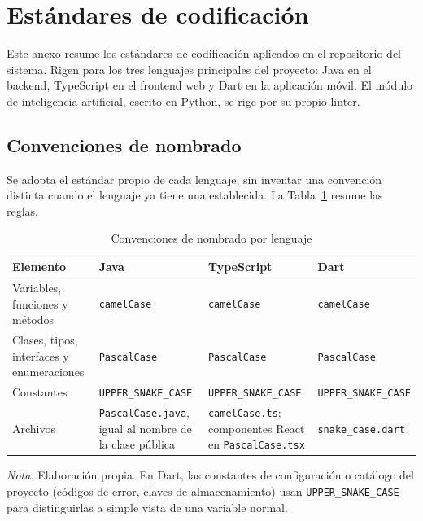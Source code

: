 \newpage
\section{Estándares de codificación}\label{ap:estandares_codificacion}

Este anexo resume los estándares de codificación aplicados en el repositorio del sistema. Rigen para los tres lenguajes principales del proyecto: Java en el backend, TypeScript en el frontend web y Dart en la aplicación móvil. El módulo de inteligencia artificial, escrito en Python, se rige por su propio linter.

\subsection{Convenciones de nombrado}

Se adopta el estándar propio de cada lenguaje, sin inventar una convención distinta cuando el lenguaje ya tiene una establecida. La Tabla~\ref{tab:estandar_nombrado} resume las reglas.

\begin{table}[H]
\caption{Convenciones de nombrado por lenguaje}
\label{tab:estandar_nombrado}
\begin{threeparttable}
\begin{tabular}{>{\raggedright\arraybackslash}p{2.8cm} >{\raggedright\arraybackslash}p{3.8cm} >{\raggedright\arraybackslash}p{3.8cm} >{\raggedright\arraybackslash}p{3.6cm}}
\toprule
Elemento & Java & TypeScript & Dart \\
\midrule
Variables, funciones y métodos & \texttt{camelCase} & \texttt{camelCase} & \texttt{camelCase} \\
Clases, tipos, interfaces y enumeraciones & \texttt{PascalCase} & \texttt{PascalCase} & \texttt{PascalCase} \\
Constantes & \texttt{UPPER\_SNAKE\_CASE} & \texttt{UPPER\_SNAKE\_CASE} & \texttt{UPPER\_SNAKE\_CASE} \\
Archivos & \texttt{PascalCase.java}, igual al nombre de la clase pública & \texttt{camelCase.ts}; componentes React en \texttt{PascalCase.tsx} & \texttt{snake\_case.dart} \\
\bottomrule
\end{tabular}
\begin{tablenotes}
\item \textit{Nota.} Elaboración propia. En Dart, las constantes de configuración o catálogo del proyecto (códigos de error, claves de almacenamiento) usan \texttt{UPPER\_SNAKE\_CASE} para distinguirlas a simple vista de una variable normal.
\end{tablenotes}
\end{threeparttable}
\end{table}

